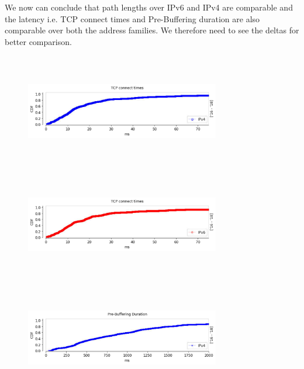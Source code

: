 We now can conclude that path lengths over IPv6 and IPv4 are comparable and the latency i.e. TCP connect times and Pre-Buffering duration are also comparable over 
both the address families. We therefore need to see the deltas for better comparison.

\begin{figure}
	\centering
	\begin{minipage}{0.5\textwidth}
		\centering
		\includegraphics[keepaspectratio, height=5cm, width=8.5cm]{figures/tcp/netflix-syn-time-absolute-difference-v4.pdf}
	\end{minipage}
	\begin{minipage}{0.5\textwidth}
		\centering
		\includegraphics[keepaspectratio, height=5cm, width=8.5cm]{figures/tcp/netflix-syn-time-absolute-difference-v6.pdf}
	\end{minipage}
	\begin{minipage}{0.5\textwidth}
		\centering
		\includegraphics[keepaspectratio, height=5cm, width=8.5cm]{figures/tcp/netflix-prebuffering-duration-absolute-difference-v4.pdf}

\end{minipage}
\end{figure}
